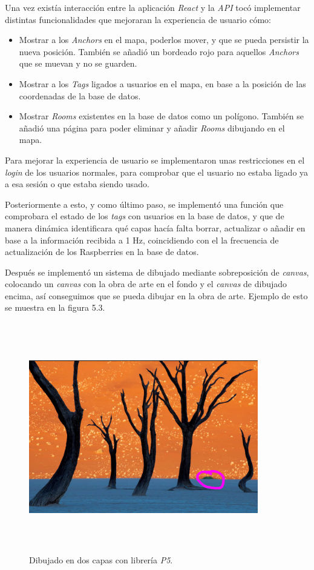 Una vez existía interacción entre la aplicación \textit{React} y la \textit{API} tocó implementar distintas funcionalidades que mejoraran la experiencia de usuario cómo:

\begin{itemize}
    \item Mostrar a los \textit{Anchors} en el mapa, poderlos mover, y que se pueda persistir la nueva posición. También se añadió un bordeado rojo para aquellos \textit{Anchors} que se muevan y no se guarden.
    \item Mostrar a los \textit{Tags} ligados a usuarios en el mapa, en base a la posición de las coordenadas de la base de datos.
    \item Mostrar \textit{Rooms} existentes en la base de datos como un polígono. También se añadió una página para poder eliminar y añadir \textit{Rooms} dibujando en el mapa.
\end{itemize}

Para mejorar la experiencia de usuario se implementaron unas restricciones en el \textit{login} de los usuarios normales, para comprobar que el usuario no estaba ligado ya a esa sesión o que estaba siendo usado.

Posteriormente a esto, y como último paso, se implementó una función que comprobara el estado de los \textit{tags} con usuarios en la base de datos, y que de manera dinámica identificara qué capas hacía falta borrar, actualizar o añadir en base a la información recibida a 1 Hz, coincidiendo con el la frecuencia de actualización de los Raspberries en la base de datos.

Después se implementó un sistema de dibujado mediante sobreposición de \textit{canvas}, colocando un \textit{canvas} con la obra de arte en el fondo y el \textit{canvas} de dibujado encima, así conseguimos que se pueda dibujar en la obra de arte. Ejemplo de esto se muestra en la figura 5.3.

\FloatBarrier
\begin{figure}[h]
    \centering
    \includegraphics[width=10cm,height=10cm,keepaspectratio]{img/P5Example.png}
    \caption{Dibujado en dos capas con librería \textit{P5}.}
    \label{fig:Example-P5}
\end{figure}
\FloatBarrier
